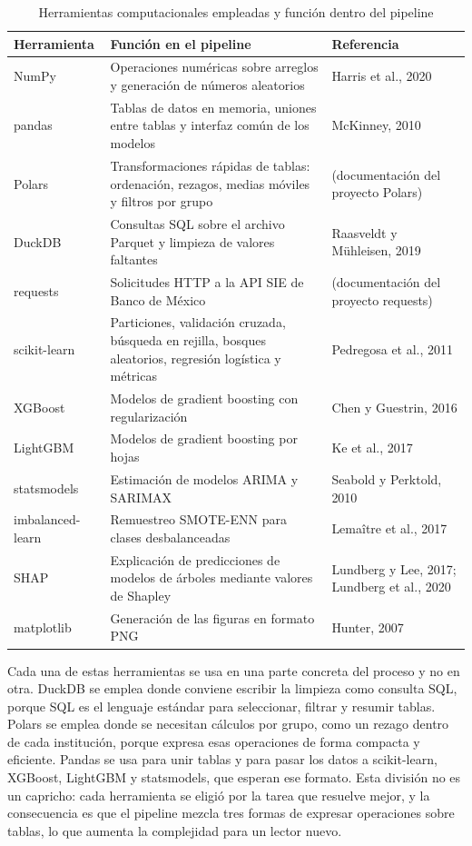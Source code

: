 \begin{table}[H]
\centering
\caption{Herramientas computacionales empleadas y función dentro del pipeline}
\label{tab:met_librerias}
\small
\begin{tabularx}{\textwidth}{p{3.2cm}Xp{3.2cm}}
\toprule
\textbf{Herramienta} & \textbf{Función en el pipeline} & \textbf{Referencia} \\
\midrule
NumPy & Operaciones numéricas sobre arreglos y generación de números aleatorios & Harris et al., 2020 \\
pandas & Tablas de datos en memoria, uniones entre tablas y interfaz común de los modelos & McKinney, 2010 \\
Polars & Transformaciones rápidas de tablas: ordenación, rezagos, medias móviles y filtros por grupo & (documentación del proyecto Polars) \\
DuckDB & Consultas SQL sobre el archivo Parquet y limpieza de valores faltantes & Raasveldt y Mühleisen, 2019 \\
requests & Solicitudes HTTP a la API SIE de Banco de México & (documentación del proyecto requests) \\
scikit-learn & Particiones, validación cruzada, búsqueda en rejilla, bosques aleatorios, regresión logística y métricas & Pedregosa et al., 2011 \\
XGBoost & Modelos de gradient boosting con regularización & Chen y Guestrin, 2016 \\
LightGBM & Modelos de gradient boosting por hojas & Ke et al., 2017 \\
statsmodels & Estimación de modelos ARIMA y SARIMAX & Seabold y Perktold, 2010 \\
imbalanced-learn & Remuestreo SMOTE-ENN para clases desbalanceadas & Lemaître et al., 2017 \\
SHAP & Explicación de predicciones de modelos de árboles mediante valores de Shapley & Lundberg y Lee, 2017; Lundberg et al., 2020 \\
matplotlib & Generación de las figuras en formato PNG & Hunter, 2007 \\
\bottomrule
\end{tabularx}
\end{table}


Cada una de estas herramientas se usa en una parte concreta del proceso y no en otra. DuckDB se emplea donde conviene escribir la limpieza como consulta SQL, porque SQL es el lenguaje estándar para seleccionar, filtrar y resumir tablas. Polars se emplea donde se necesitan cálculos por grupo, como un rezago dentro de cada institución, porque expresa esas operaciones de forma compacta y eficiente. Pandas se usa para unir tablas y para pasar los datos a scikit-learn, XGBoost, LightGBM y statsmodels, que esperan ese formato. Esta división no es un capricho: cada herramienta se eligió por la tarea que resuelve mejor, y la consecuencia es que el pipeline mezcla tres formas de expresar operaciones sobre tablas, lo que aumenta la complejidad para un lector nuevo.

